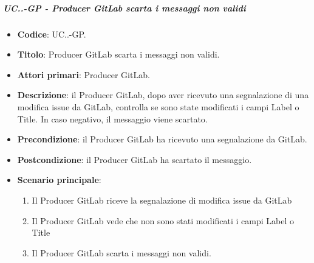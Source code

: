 		\subparagraph{UC\theuccount.\thesubuccount.\thesubsubuccount-GP - Producer GitLab scarta i messaggi non validi}
			
			\begin{itemize}
				\item \textbf{Codice}: UC\theuccount.\thesubuccount.\thesubsubuccount-GP.
				\item \textbf{Titolo}: Producer GitLab scarta i messaggi non validi.
				\item \textbf{Attori primari}: Producer GitLab.
				\item \textbf{Descrizione}: il Producer GitLab, dopo aver ricevuto una segnalazione di una modifica issue da GitLab, controlla
				se sono state modificati i campi Label o Title. In caso negativo, il messaggio viene scartato.
				\item \textbf{Precondizione}: il Producer GitLab ha ricevuto una segnalazione da GitLab.
				\item \textbf{Postcondizione}: il Producer GitLab ha scartato il messaggio.
				\item \textbf{Scenario principale}: 
				\begin{enumerate}
					\item Il Producer GitLab riceve la segnalazione di modifica issue da GitLab
					\item Il Producer GitLab vede che non sono stati modificati i campi Label o Title
					\item Il Producer GitLab scarta i messaggi non validi.
				\end{enumerate}
			\end{itemize}